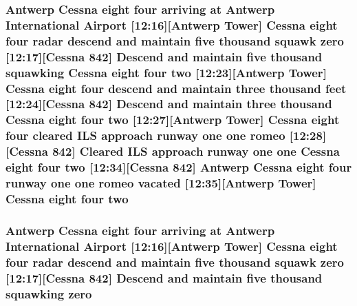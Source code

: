 \subsubsection[{\texorpdfstring{two}{two}}]{\setlength{\rightskip}{0pt plus 5cm}Antwerp {\bf Cessna} eight four arriving at Antwerp International {\bf Airport} \mbox{[}12\+:16\mbox{]}\mbox{[}Antwerp {\bf Tower}\mbox{]} {\bf Cessna} eight four radar descend and maintain five {\bf thousand} squawk {\bf zero} \mbox{[}12\+:17\mbox{]}\mbox{[}{\bf Cessna} 842\mbox{]} Descend and maintain five {\bf thousand} {\bf squawking} {\bf Cessna} eight four two \mbox{[}12\+:23\mbox{]}\mbox{[}Antwerp {\bf Tower}\mbox{]} {\bf Cessna} eight four descend and maintain three {\bf thousand} {\bf feet} \mbox{[}12\+:24\mbox{]}\mbox{[}{\bf Cessna} 842\mbox{]} Descend and maintain three {\bf thousand} {\bf Cessna} eight four two \mbox{[}12\+:27\mbox{]}\mbox{[}Antwerp {\bf Tower}\mbox{]} {\bf Cessna} eight four cleared I\+LS approach runway {\bf one} {\bf one} {\bf romeo} \mbox{[}12\+:28\mbox{]}\mbox{[}{\bf Cessna} 842\mbox{]} Cleared I\+LS approach runway {\bf one} {\bf one} {\bf Cessna} eight four two \mbox{[}12\+:34\mbox{]}\mbox{[}{\bf Cessna} 842\mbox{]} Antwerp {\bf Cessna} eight four runway {\bf one} {\bf one} {\bf romeo} vacated \mbox{[}12\+:35\mbox{]}\mbox{[}Antwerp {\bf Tower}\mbox{]} {\bf Cessna} eight four two}\hypertarget{happyDay1ExpectedATC_8txt_aa0469efe401676f277c03bf9d9d4a983}{}\label{happyDay1ExpectedATC_8txt_aa0469efe401676f277c03bf9d9d4a983}
\subsubsection[{\texorpdfstring{zero}{zero}}]{\setlength{\rightskip}{0pt plus 5cm}Antwerp {\bf Cessna} eight four arriving at Antwerp International {\bf Airport} \mbox{[}12\+:16\mbox{]}\mbox{[}Antwerp {\bf Tower}\mbox{]} {\bf Cessna} eight four radar descend and maintain five {\bf thousand} squawk zero \mbox{[}12\+:17\mbox{]}\mbox{[}{\bf Cessna} 842\mbox{]} Descend and maintain five {\bf thousand} {\bf squawking} zero}\hypertarget{happyDay1ExpectedATC_8txt_adce466d7618784129bcb0feb6d2d98e4}{}\label{happyDay1ExpectedATC_8txt_adce466d7618784129bcb0feb6d2d98e4}
